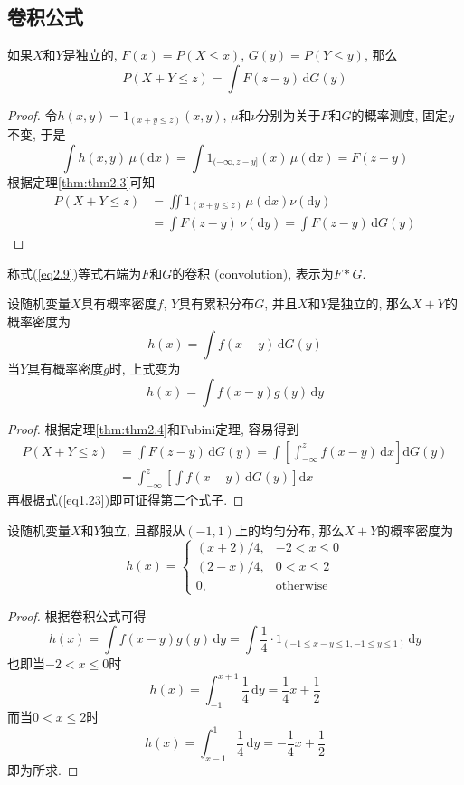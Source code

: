 \documentclass[cn, 12pt, math=mtpro2, bibstyle=apa, blue, twocol]{elegantbook}
\begin{document}
\subsection{卷积公式}
\begin{theorem}\label{thm:thm2.4}
  如果$X$和$Y$是独立的, $F(x)=P(X\leq x)$, $G(y)=P(Y\leq y)$, 那么
  \begin{equation}\label{eq2.9}
    P(X+Y\leq z)=\int F(z-y)\,\text{d}G(y)
  \end{equation}
\end{theorem}
\begin{proof}
  令$h(x,y)=1_{(x+y\leq z)}(x,y)$, $\mu$和$\nu$分别为关于$F$和$G$的概率测度, 固定$y$不变, 于是
  $$\int h(x,y)\,\mu(\text{d}x)=\int 1_{(-\infty,z-y]}(x)\,\mu(\text{d}x)=F(z-y)$$
  根据定理\ref{thm:thm2.3}可知
  \begin{align*}
  P(X+Y\leq z)&=\iint 1_{(x+y\leq z)}\,\mu(\text{d}x)\nu(\text{d}y) \\
  &=\int F(z-y)\,\nu(\text{d}y)=\int F(z-y)\,\text{d}G(y)
  \end{align*}
\end{proof}
\begin{remark}
称式(\ref{eq2.9})等式右端为$F$和$G$的卷积 (convolution), 表示为$F\ast G$.
\end{remark}

\begin{theorem}\label{thm:thm2.5}
  设随机变量$X$具有概率密度$f$, $Y$具有累积分布$G$, 并且$X$和$Y$是独立的, 那么$X+Y$的概率密度为
  $$h(x)=\int f(x-y)\,\text{d}G(y)$$
  当$Y$具有概率密度$g$时, 上式变为
  $$h(x)=\int f(x-y)g(y)\,\text{d}y$$
\end{theorem}
\begin{proof}
  根据定理\ref{thm:thm2.4}和Fubini定理, 容易得到
  \begin{align*}
  P(X+Y\leq z)&=\int F(z-y)\,\text{d}G(y)=\int\left[\int_{-\infty}^zf(x-y)\,\text{d}x\right]\text{d}G(y) \\
  &=\int_{-\infty}^z\left[\int f(x-y)\,\text{d}G(y)\right]\text{d}x
  \end{align*}
  再根据式(\ref{eq1.23})即可证得第二个式子.
\end{proof}
\begin{example}
设随机变量$X$和$Y$独立, 且都服从$(-1,1)$上的均匀分布, 那么$X+Y$的概率密度为
$$h(x)=\begin{cases}
         (x+2)/4, & -2<x\leq 0 \\
         (2-x)/4, & 0<x\leq 2 \\
         0,& \text{otherwise}
       \end{cases}$$
\end{example}
\begin{proof}
  根据卷积公式可得
  $$h(x)=\int f(x-y)g(y)\,\text{d}y=\int \frac{1}{4}\cdot 1_{(-1\leq x-y\leq 1, -1\leq y\leq 1)}\,\text{d}y$$
  也即当$-2<x\leq 0$时
  $$h(x)=\int_{-1}^{x+1}\frac{1}{4}\,\text{d}y=\frac{1}{4}x+\frac{1}{2}$$
  而当$0<x\leq 2$时
  $$h(x)=\int_{x-1}^{1}\frac{1}{4}\,\text{d}y=-\frac{1}{4}x+\frac{1}{2}$$
  即为所求.
\end{proof}
\end{document}

